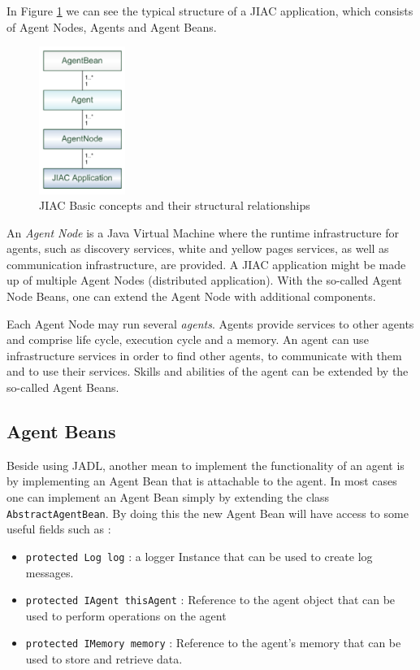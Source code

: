 In Figure \ref{fig:jiac_basic} we can see the typical structure of a JIAC application, which consists of Agent Nodes, Agents and Agent Beans.
\begin{figure}[h]
	\centering
		\includegraphics[width=0.25\textwidth]{images/jiac_basic.png}
		\caption{JIAC Basic concepts and their structural relationships \cite{JIACMAN10}}
	\label{fig:jiac_basic}
\end{figure}
An \textit{Agent Node} is a Java Virtual Machine where the runtime infrastructure for agents, such as discovery services, white and yellow pages services, as well as communication infrastructure, are provided. A JIAC application might be made up of multiple Agent Nodes (distributed application). With the so-called Agent Node Beans, one can extend the Agent Node with additional components.

Each Agent Node may run several \textit{agents}. Agents provide services to other agents
and comprise life cycle, execution cycle and a memory. An agent can use infrastructure
services in order to find other agents, to communicate with them and to use their services.
Skills and abilities of the agent can be extended by the so-called Agent Beans.


\subsection{Agent Beans}
Beside using JADL, another mean to implement the functionality of an agent is by implementing an Agent Bean that is attachable to the agent.
In most cases one can implement an Agent Bean simply by extending the class \texttt{AbstractAgentBean}. By doing this the new Agent Bean will have access to some useful fields such as :
\begin{itemize}
	\item \texttt{protected Log log} : a logger Instance that can be used to create log messages.
	\item \texttt{protected IAgent thisAgent} : Reference to the agent object that can be used to perform operations on the agent
	\item \texttt{protected IMemory memory} : Reference to the agent's memory that can be used to store and retrieve data.
\end{itemize}

